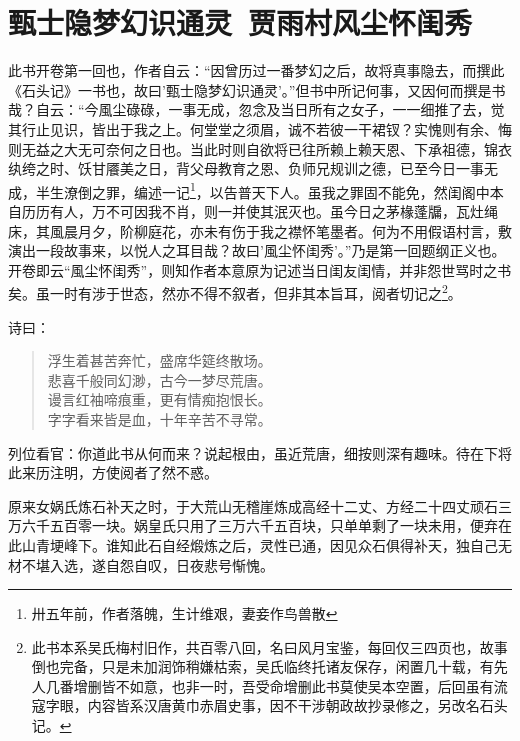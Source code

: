 \documentclass[12pt,oneside]{book}
\newenvironment{shici}{%
\begin{verse}%
\centering\large\hspace{12pt}}%
{\end{verse}}
\begin{document}
\setcounter{tocdepth}{2}    
\tableofcontents



\mainmatter


\chapter{甄士隐梦幻识通灵~贾雨村风尘怀闺秀}
此书开卷第一回也，作者自云：“因曾历过一番梦幻之后，故将真事隐去，而撰此《石头记》一书也，故曰’甄士隐梦幻识通灵’。”但书中所记何事，又因何而撰是书哉？自云：“今風尘碌碌，一事无成，忽念及当日所有之女子，一一细推了去，觉其行止见识，皆出于我之上。何堂堂之须眉，诚不若彼一干裙钗？实愧则有余、悔则无益之大无可奈何之日也。当此时则自欲将已往所赖上赖天恩、下承祖德，锦衣纨绔之时、饫甘餍美之日，背父母教育之恩、负师兄规训之德，已至今日一事无成，半生潦倒之罪，编述一记\footnote{卅五年前，作者落魄，生计维艰，妻妾作鸟兽散}，以告普天下人。虽我之罪固不能免，然闺阁中本自历历有人，万不可因我不肖，则一并使其泯灭也。虽今日之茅椽蓬牖，瓦灶绳床，其風晨月夕，阶柳庭花，亦未有伤于我之襟怀笔墨者。何为不用假语村言，敷演出一段故事来，以悦人之耳目哉？故曰’風尘怀闺秀’。”乃是第一回题纲正义也。开卷即云“風尘怀闺秀”，则知作者本意原为记述当日闺友闺情，并非怨世骂时之书矣。虽一时有涉于世态，然亦不得不叙者，但非其本旨耳，阅者切记之\footnote{此书本系吴氏梅村旧作，共百零八回，名曰风月宝鉴，每回仅三四页也，故事倒也完备，只是未加润饰稍嫌枯索，吴氏临终托诸友保存，闲置几十载，有先人几番增删皆不如意，也非一时，吾受命增删此书莫使吴本空置，后回虽有流寇字眼，内容皆系汉唐黄巾赤眉史事，因不干涉朝政故抄录修之，另改名石头记。}。

诗曰：

\begin{shici}
浮生着甚苦奔忙，盛席华筵终散场。\\
悲喜千般同幻渺，古今一梦尽荒唐。\\
谩言红袖啼痕重，更有情痴抱恨长。\\
字字看来皆是血，十年辛苦不寻常。
\end{shici}


列位看官：你道此书从何而来？说起根由，虽近荒唐，细按则深有趣味。待在下将此来历注明，方使阅者了然不惑。

原来女娲氏炼石补天之时，于大荒山无稽崖炼成高经十二丈、方经二十四丈顽石三万六千五百零一块。娲皇氏只用了三万六千五百块，只单单剩了一块未用，便弃在此山青埂峰下。谁知此石自经煅炼之后，灵性已通，因见众石俱得补天，独自己无材不堪入选，遂自怨自叹，日夜悲号惭愧。
\end{document}
